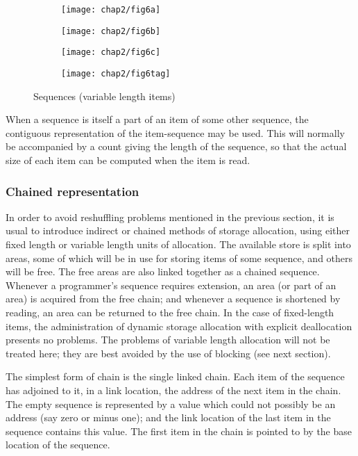 \begin{figure}[h]
	\centering
	\begin{subfigure}[b]{0.3\textwidth}
		\centering
		\texttt{[image: chap2/fig6a]}
		\caption{}
	\end{subfigure}	
	\begin{subfigure}[b]{0.3\textwidth}
		\centering
		\texttt{[image: chap2/fig6b]}
		\caption{}
	\end{subfigure}	
	\begin{subfigure}[b]{0.3\textwidth}
		\centering
		\texttt{[image: chap2/fig6c]}
		\caption{}
	\end{subfigure}
	
	\begin{subfigure}[t]{0.15\textwidth}
		\centering
		\texttt{[image: chap2/fig6tag]}
	\end{subfigure}
	\caption{Sequences (variable length items)}
\end{figure}

When a sequence is itself a part of an item of some other sequence, the contiguous representation of the item-sequence may be used. This will normally be accompanied by a count giving the length of the sequence, so that the actual size of each item can be computed when the item is read.

\subsubsection{Chained representation}

In order to avoid reshuffling problems mentioned in the previous section, it is usual to introduce indirect or chained methods of storage allocation, using either fixed length or variable length units of allocation. The available store is split into areas, some of which will be in use for storing items of some sequence, and others will be free. The free areas are also linked together as a chained sequence. Whenever a programmer's sequence requires extension, an area (or part of an area) is acquired from the free chain; and whenever a sequence is shortened by reading, an area can be returned to the free chain. In the case of fixed-length items, the administration of dynamic storage allocation with explicit deallocation presents no problems. The problems of variable length allocation will not be treated here; they are best avoided by the use of blocking (see next section).

The simplest form of chain is the single linked chain. Each item of the sequence has adjoined to it, in a link location, the address of the next item in the chain. The empty sequence is represented by a value which could not possibly be an address (say zero or minus one); and the link location of the last item in the sequence contains this value. The first item in the chain is pointed to by the base location of the sequence.

